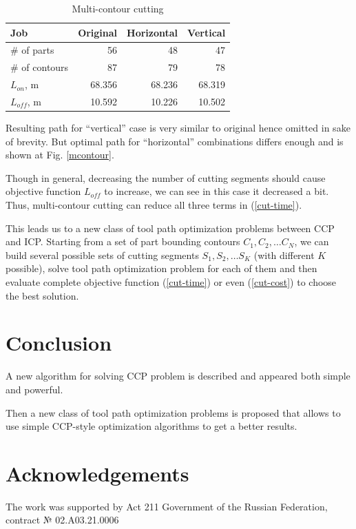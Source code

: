 \documentclass{../download/tPRS2e}
\begin{document}
\begin{table}[]
    \begin{center}    
    \begin{tabular}{l|*{3}{r}}
        Job & Original & Horizontal & Vertical \\
        \hline
        \# of parts & 56 & 48 & 47\\
        \# of contours & 87 & 79 & 78 \\
        $L_{on}$, m & 68.356 & 68.236 & 68.319 \\
        $L_{off}$, m & 10.592 & 10.226 & 10.502 \\
    \end{tabular}
    \caption{Multi-contour cutting}
    \label{hv-data}
    \end{center}
\end{table}

Resulting path for ``vertical'' case is very similar to original 
hence omitted in sake of brevity.
But optimal path for ``horizontal'' combinations differs enough
and is shown at Fig. \ref{mcontour}.

Though in general,
decreasing the number of cutting segments
should cause objective function
$L_{off}$ to increase,
we can see in this case it decreased a bit.
Thus, multi-contour cutting can reduce 
all three terms in (\ref{cut-time}).

This leads us to a new class of tool path optimization problems
between CCP and ICP.
Starting from a set of part bounding contours
$C_1, C_2, \dots C_N$,
we can build several possible sets of cutting segments
$S_1, S_2, \dots S_K$
(with different $K$ possible),
solve tool path optimization problem for each of them
and then evaluate complete objective
function (\ref{cut-time}) or even (\ref{cut-cost})
to choose the best solution.

\section{Conclusion}

A new algorithm for solving CCP problem is
described and appeared both simple and powerful.

Then a new class of tool path optimization problems
is proposed
that allows to use simple CCP-style optimization 
algorithms to get a better results.

\section*{Acknowledgements}

The work was supported by Act 211 Government of the Russian Federation, contract № 02.A03.21.0006


\nocite{*}

\end{document}

